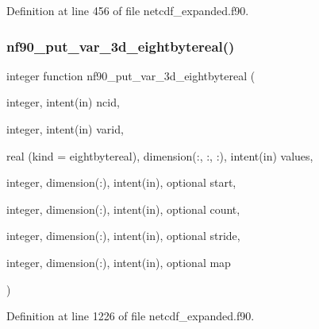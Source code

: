 Definition at line 456 of file netcdf\+\_\+expanded.\+f90.

\mbox{\label{netcdf__expanded_8f90_ab24c68271006887283a4e0c3b53abc86}} 
\subsubsection{\texorpdfstring{nf90\+\_\+put\+\_\+var\+\_\+3d\+\_\+eightbytereal()}{nf90\_put\_var\_3d\_eightbytereal()}}
{\footnotesize\ttfamily integer function nf90\+\_\+put\+\_\+var\+\_\+3d\+\_\+eightbytereal (\begin{DoxyParamCaption}\item[{integer, intent(in)}]{ncid,  }\item[{integer, intent(in)}]{varid,  }\item[{real (kind = eightbytereal), dimension(\+:, \+:, \+:), intent(in)}]{values,  }\item[{integer, dimension(\+:), intent(in), optional}]{start,  }\item[{integer, dimension(\+:), intent(in), optional}]{count,  }\item[{integer, dimension(\+:), intent(in), optional}]{stride,  }\item[{integer, dimension(\+:), intent(in), optional}]{map }\end{DoxyParamCaption})}



Definition at line 1226 of file netcdf\+\_\+expanded.\+f90.

\mbox{\label{netcdf__expanded_8f90_a293825f1af9d4d7e91076224ab72768e}} 
